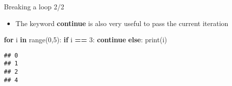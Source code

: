 \documentclass[
  8pt,
  ignorenonframetext,
]{beamer}
\newenvironment{Shaded}{\begin{snugshade}}{\end{snugshade}}
\newcommand{\BuiltInTok}[1]{#1}
\newcommand{\ControlFlowTok}[1]{\textcolor[rgb]{0.13,0.29,0.53}{\textbf{#1}}}
\newcommand{\DecValTok}[1]{\textcolor[rgb]{0.00,0.00,0.81}{#1}}
\newcommand{\KeywordTok}[1]{\textcolor[rgb]{0.13,0.29,0.53}{\textbf{#1}}}
\newcommand{\NormalTok}[1]{#1}
\newcommand{\OperatorTok}[1]{\textcolor[rgb]{0.81,0.36,0.00}{\textbf{#1}}}
\providecommand{\tightlist}{%
  \setlength{\itemsep}{0pt}\setlength{\parskip}{0pt}}
\begin{document}
\begin{frame}[fragile]{Breaking a loop 2/2}
\protect\hypertarget{breaking-a-loop-22}{}
\begin{itemize}
\tightlist
\item
  The keyword \textbf{continue} is also very useful to pass the current
  iteration
\end{itemize}

\begin{Shaded}
\begin{Highlighting}[]
\ControlFlowTok{for}\NormalTok{ i }\KeywordTok{in} \BuiltInTok{range}\NormalTok{(}\DecValTok{0}\NormalTok{,}\DecValTok{5}\NormalTok{):}
  \ControlFlowTok{if}\NormalTok{ i }\OperatorTok{==} \DecValTok{3}\NormalTok{:}
    \ControlFlowTok{continue}
  \ControlFlowTok{else}\NormalTok{:}
    \BuiltInTok{print}\NormalTok{(i)}
\end{Highlighting}
\end{Shaded}

\begin{verbatim}
## 0
## 1
## 2
## 4
\end{verbatim}
\end{frame}
\end{document}
